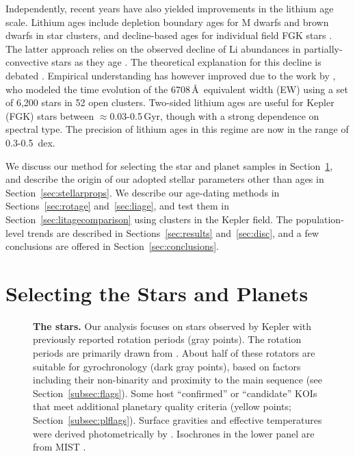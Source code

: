 \documentclass[11pt,twocolumn,tighten]{aastex63}
\begin{document}
Independently, recent years have also yielded improvements in the
lithium age scale.  Lithium ages include 
depletion boundary ages for M dwarfs and brown dwarfs in star
clusters, and decline-based ages for individual field
FGK stars \citep{Soderblom_2010}.  The latter
approach relies on the observed decline of Li abundances in
partially-convective stars as they age
\citep[e.g.][]{2005A&A...442..615S}.  The theoretical explanation for
this decline is debated
\citep[e.g.][]{1995ApJ...441..865C,2010ApJ...716.1269D,2019MNRAS.485.4052C}.
Empirical understanding has however improved due to the work by
\citet{Jeffries_2023}, who modeled the time evolution of the
 6708\,\AA\ equivalent width (EW) using a set of 6{,}200
stars in 52 open clusters.  Two-sided lithium ages are useful for
Kepler (FGK) stars between $\approx$0.03-0.5\,Gyr, though with a strong
dependence on spectral type.  The precision of lithium ages 
in this regime are now in the range of 0.3-0.5~dex.

We discuss our method for selecting the star and planet samples in
Section~\ref{sec:selection}, and describe the origin of our adopted
stellar parameters other than ages in Section~\ref{sec:stellarprops}.
We describe our age-dating methods in
Sections~\ref{sec:rotage} and~\ref{sec:liage}, and test them in
Section~\ref{sec:litagecomparison} using
clusters in the Kepler field.  The population-level
trends are described in
Sections~\ref{sec:results} and~\ref{sec:disc}, and a few conclusions
are offered in Section~\ref{sec:conclusions}.


\section{Selecting the Stars and Planets}
\label{sec:selection}


\begin{figure}[!t]
	\begin{center}
	
		\vspace{-0.3cm}
	\end{center}
	\vspace{-0.5cm}
  \caption{{\bf The stars.}  Our analysis focuses on stars observed by
  Kepler with previously reported rotation periods (gray points).  The
  rotation periods are primarily drawn from
  \citet{Santos_2019,Santos_2021}.  About half of these rotators are
  suitable for gyrochronology (dark gray points), based on factors
  including their non-binarity and proximity to the main
  sequence (see Section~\ref{subsec:flags}).  Some
  host ``confirmed'' or ``candidate'' KOIs that meet additional
  planetary quality criteria (yellow points;
  Section~\ref{subsec:plflags}).  Surface gravities and effective
  temperatures were derived photometrically by
  \citet{Berger_2020a_catalog}.  Isochrones in the lower panel are
  from MIST \citep{Choi_2016}.
	}
	\label{fig:stellarprops}
\end{figure}
\end{document}

